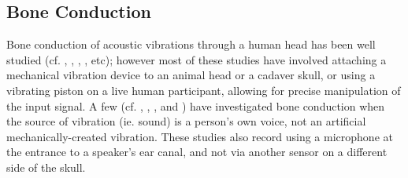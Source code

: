 \subsection{Bone Conduction}
Bone conduction of acoustic vibrations through a human head has been well studied (cf. \cite{allen:60}, \cite{hakansson:94}, \cite{stenfelt:00}, \cite{reinfeldt:10}, etc); however most of these studies have involved attaching a mechanical vibration device to an animal head or a cadaver skull, or using a vibrating piston on a live human participant, allowing for precise manipulation of the input signal.  
% 
%
A few (cf. \cite{bekesy:48}, \cite{hansen:97b}, \cite{porschmann:00}, and \cite{reinfeldt:10}) have investigated bone conduction when the source of vibration (ie. sound) is a person's own voice, not an artificial mechanically-created vibration.  These studies also record using a microphone at the entrance to a speaker's ear canal, and not via another sensor on a different side of the skull.

